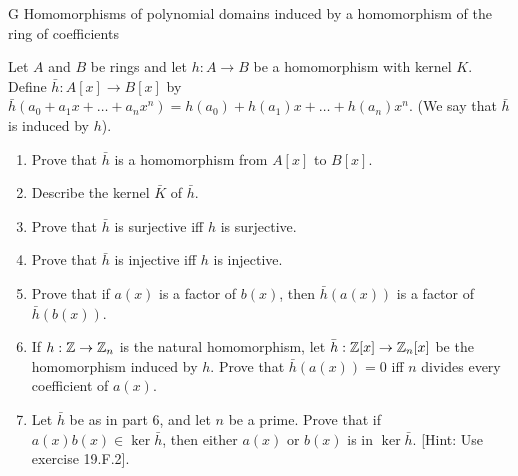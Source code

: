 \begin{exercise}{G Homomorphisms of polynomial domains induced by a homomorphism of the ring of coefficients}

Let $A$ and $B$ be rings and let $h:A\rightarrow B$ be a homomorphism with kernel $K$. Define $\bar{h}:A[x]\rightarrow B[x]$ by $\bar{h}(a_0+a_1x+\dots+a_nx^n)=h(a_0)+h(a_1)x+\dots+h(a_n)x^n$. (We say that $\bar{h}$ is induced by $h$).
\begin{enumerate}
    \item Prove that $\bar{h}$ is a homomorphism from $A[x]$ to $B[x]$.
    \item Describe the kernel $\bar{K}$ of $\bar{h}$.
    \item Prove that $\bar{h}$ is surjective iff $h$ is surjective.
    \item Prove that $\bar{h}$ is injective iff $h$ is injective.
    \item Prove that if $a(x)$ is a factor of $b(x)$, then $\bar{h}(a(x))$ is a factor of $\bar{h}(b(x))$.
    \item If $h:\mathbb{Z}\rightarrow\mathbb{Z}_n$ is the natural homomorphism, let $\bar{h}:\mathbb{Z}[x]\rightarrow\mathbb{Z}_n[x]$ be the homomorphism induced by $h$. Prove that $\bar{h}(a(x))=0$ iff $n$ divides every coefficient of $a(x)$.
    \item Let $\bar{h}$ be as in part 6, and let $n$ be a prime. Prove that if $a(x)b(x)\in\ker{\bar{h}}$, then either $a(x)$ or $b(x)$ is in $\ker{\bar{h}}$. [Hint: Use exercise 19.F.2].
\end{enumerate}
\end{exercise}
